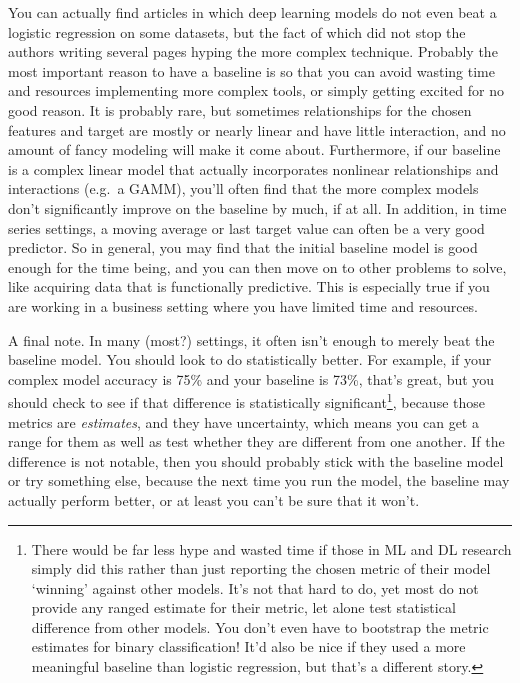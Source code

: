 \documentclass[
  letterpaper,
]{krantz}
\begin{document}
You can actually find articles in which deep learning models do not even
beat a logistic regression on some datasets, but the fact of which did
not stop the authors writing several pages hyping the more complex
technique. Probably the most important reason to have a baseline is so
that you can avoid wasting time and resources implementing more complex
tools, or simply getting excited for no good reason. It is probably
rare, but sometimes relationships for the chosen features and target are
mostly or nearly linear and have little interaction, and no amount of
fancy modeling will make it come about. Furthermore, if our baseline is
a complex linear model that actually incorporates nonlinear
relationships and interactions (e.g.~a GAMM), you'll often find that the
more complex models don't significantly improve on the baseline by much,
if at all. In addition, in time series settings, a moving average or
last target value can often be a very good predictor. So in general, you
may find that the initial baseline model is good enough for the time
being, and you can then move on to other problems to solve, like
acquiring data that is functionally predictive. This is especially true
if you are working in a business setting where you have limited time and
resources.

A final note. In many (most?) settings, it often isn't enough to merely
beat the baseline model. You should look to do statistically better. For
example, if your complex model accuracy is 75\% and your baseline is
73\%, that's great, but you should check to see if that difference is
statistically significant\footnote{There would be far less hype and
  wasted time if those in ML and DL research simply did this rather than
  just reporting the chosen metric of their model `winning' against
  other models. It's not that hard to do, yet most do not provide any
  ranged estimate for their metric, let alone test statistical
  difference from other models. You don't even have to bootstrap the
  metric estimates for binary classification! It'd also be nice if they
  used a more meaningful baseline than logistic regression, but that's a
  different story.}, because those metrics are \emph{estimates}, and
they have uncertainty, which means you can get a range for them as well
as test whether they are different from one another. If the difference
is not notable, then you should probably stick with the baseline model
or try something else, because the next time you run the model, the
baseline may actually perform better, or at least you can't be sure that
it won't.
\end{document}
